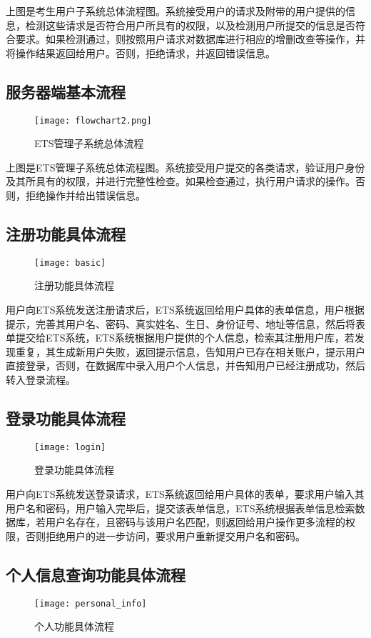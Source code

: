 上图是考生用户子系统总体流程图。系统接受用户的请求及附带的用户提供的信息，检测这些请求是否符合用户所具有的权限，以及检测用户所提交的信息是否符合要求。如果检测通过，则按照用户请求对数据库进行相应的增删改查等操作，并将操作结果返回给用户。否则，拒绝请求，并返回错误信息。

\subsection{服务器端基本流程}
\begin{figure}[ht]
\centering
\texttt{[image: flowchart2.png]}
\caption{ETS管理子系统总体流程} \label{fig:figure1}
\end{figure}

上图是ETS管理子系统总体流程图。系统接受用户提交的各类请求，验证用户身份及其所具有的权限，并进行完整性检查。如果检查通过，执行用户请求的操作。否则，拒绝操作并给出错误信息。

\subsection{注册功能具体流程}
\begin{figure}[ht]
\centering
\texttt{[image: basic]}
\caption{注册功能具体流程} \label{fig:figure1}
\end{figure}

用户向ETS系统发送注册请求后，ETS系统返回给用户具体的表单信息，用户根据提示，完善其用户名、密码、真实姓名、生日、身份证号、地址等信息，然后将表单提交给ETS系统，ETS系统根据用户提供的个人信息，检索其注册用户库，若发现重复，其生成新用户失败，返回提示信息，告知用户已存在相关账户，提示用户直接登录，否则，在数据库中录入用户个人信息，并告知用户已经注册成功，然后转入登录流程。

\subsection{登录功能具体流程}
\begin{figure}[ht]
\centering
\texttt{[image: login]}
\caption{登录功能具体流程} \label{fig:figure1}
\end{figure}

用户向ETS系统发送登录请求，ETS系统返回给用户具体的表单，要求用户输入其用户名和密码，用户输入完毕后，提交该表单信息，ETS系统根据表单信息检索数据库，若用户名存在，且密码与该用户名匹配，则返回给用户操作更多流程的权限，否则拒绝用户的进一步访问，要求用户重新提交用户名和密码。

\subsection{个人信息查询功能具体流程}
\begin{figure}[ht]
\centering
\texttt{[image: personal\_info]}
\caption{个人功能具体流程} \label{fig:figure1}
\end{figure}

